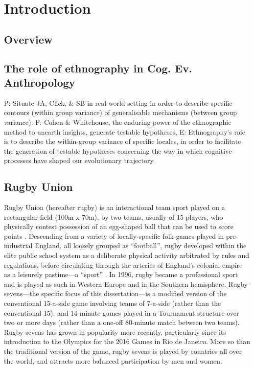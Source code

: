 \section{Introduction}

  \subsection{Overview}


  \subsection{The role of ethnography in Cog. Ev. Anthropology}
    P: Situate JA, Click, & SB in real world setting in order to describe specific contours  (within group variance) of generalisable mechanisms (between group variance).
    F: Cohen & Whitehouse, the enduring power of the ethnographic method to unearth insights, generate testable hypotheses,
    E: Ethnography's role is to describe the within-group variance of specific locales, in order to facilitate the generation of testable hypotheses concerning the way in which cognitive processes have shaped our evolutionary trajectory.

  \subsection{Rugby Union}
  Rugby Union (hereafter rugby) is an interactional team sport played on a rectangular field (100m x 70m), by two teams, usually of 15 players, who physically contest possession of an egg-shaped ball that can be used to score points \citep{IRB2014}.  Descending from a variety of locally-specific folk-games played in pre-industrial England, all loosely grouped as ``football'', rugby developed within the elite public school system as a deliberate physical activity arbitrated by rules and regulations, before circulating through the arteries of England's colonial empire as a leisurely pastime—a ``sport'' \citep{Dunning2005}.  In 1996, rugby became a professional sport and is played as such in Western Europe and in the Southern hemisphere. Rugby sevens---the specific focus of this dissertation---is a modified version of the conventional 15-a-side game involving teams of 7-a-side (rather than the conventional 15), and 14-minute games played in a Tournament structure over two or more days (rather than a one-off 80-minute match between two teams).  Rugby sevens has grown in popularity more recently, particularly since its introduction to the Olympics for the 2016 Games in Rio de Janeiro.  More so than the traditional version of the game, rugby sevens is played by countries all over the world, and attracts more balanced participation by men and women.

